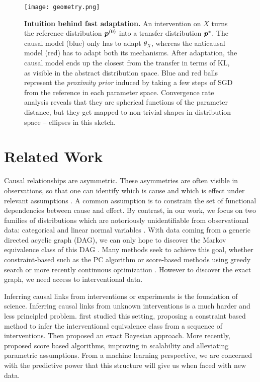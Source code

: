 \begin{figure*}
    \centering
    \texttt{[image: geometry.png]}
    \caption[Intuition behind fast adaptation]{
    \textbf{Intuition behind fast adaptation.}
    An intervention on $X$ turns the reference distribution $\bm{p}^{(0)}$ into  a transfer distribution $\bm{p}^*$.
    The causal model (blue) only has to adapt $\theta_X$, whereas the anticausal  model (red) has to adapt both its mechanisms. 
    After adaptation, the causal model ends up the closest from the transfer in terms of KL, as visible in the abstract distribution space. 
    Blue and red balls represent
    the \textit{proximity prior} induced by taking a few steps of SGD from the reference in each parameter space.
    Convergence rate analysis reveals that they are spherical functions of the parameter distance,
    but they get mapped to non-trivial shapes in distribution space -- ellipses in this sketch.
    }
    \label{fig:geometry}
\end{figure*}

\section{Related Work}

Causal relationships are asymmetric.
These asymmetries are often visible in observations, so that one can identify which is cause and which is effect under relevant assumptions \citep{mooij2016distinguishing}. 
A common assumption is to constrain the set of functional dependencies between cause and effect. 
By contrast, in our work, we focus on two families of distributions which are notoriously unidentifiable from observational data: categorical and linear normal variables \citep[Ch.4]{peters2017elements}.
With data coming from a generic directed acyclic graph (DAG), we can only hope to discover the Markov equivalence class of this DAG \citep{verma1991equivalence}.
Many methods seek to achieve this goal, whether constraint-based such as the PC algorithm \citep{spirtes2000causation} or score-based methods using greedy search \citep{chickering2002optimal} or more recently continuous optimization \citep{zheng2018dags,lachapelle2019gradient}.
However to discover the exact graph, we need access to interventional data.

Inferring  causal links from interventions or experiments is the foundation of science. 
Inferring causal links from unknown interventions is a much harder and less principled problem.
\citet{tian2001causal} first studied this setting, proposing a constraint based method to infer the interventional equivalence class  from a sequence of interventions.
Then \citet{eaton2007exact} proposed an exact Bayesian approach.
More recently, \citet{squires2019permutation,ke2019learning}  proposed score based algorithms, improving in scalability and alleviating parametric assumptions.
From a machine learning perspective, we are concerned with the predictive power that this structure will give us when faced with new data.




